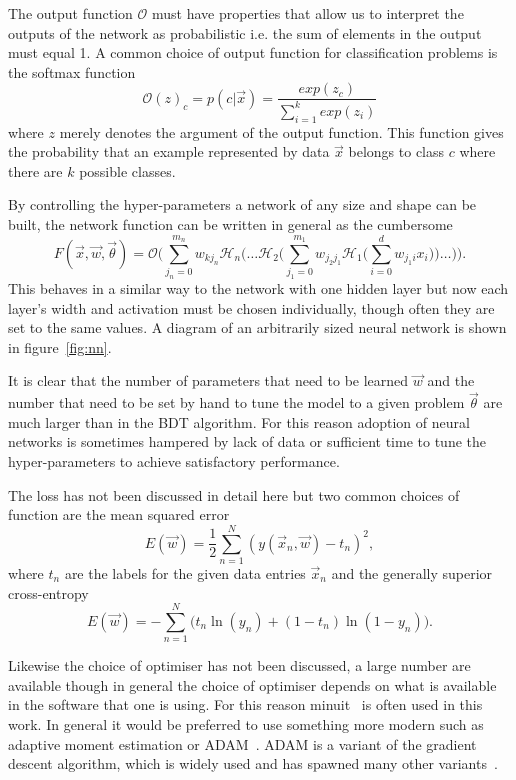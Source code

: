 The output function $\mathcal{O}$ must have properties that allow us to
interpret the outputs of the network as probabilistic i.e. the sum of elements
in the output must equal 1. A common choice of output function for
classification problems is the softmax function
\begin{equation}
  \mathcal{O}(z)_c = p(c|\vec{x}) = \frac{exp(z_c)}{\sum_{i=1}^kexp(z_i)}
  \label{eq:softmax}
\end{equation}
where $z$ merely denotes the argument of the output function. This function
gives the probability that an example represented by data $\vec{x}$ belongs to
class $c$ where there are $k$ possible classes.

By controlling the hyper-parameters a network of any size and shape can be
built, the network function can be written in general as the cumbersome
\begin{equation}
  F(\vec{x}, \vec{w}, \vec{\theta}) = \mathcal{O} \Bigg( \sum_{j_{n}=0}^{m_{n}} w_{kj_{n}}
  \mathcal{H}_{n} \Bigg( \dots \mathcal{H}_2  \Bigg( \sum_{j_{1}=0}^{m_{1}} w_{j_{2}j_{1}} 
  \mathcal{H}_{1} \Bigg( \sum_{i=0}^{d} w_{j_{1}i} x_{i} \Bigg) \Bigg) \dots \Bigg) \Bigg).
  \label{eq:fullnn}
\end{equation}
This behaves in a similar way to the network with one hidden layer but now each
layer's width and activation must be chosen individually, though often they are
set to the same values. A diagram of an arbitrarily sized neural network is
shown in figure~\ref{fig:nn}.

It is clear that the number of parameters that need to be learned $\vec{w}$ and
the number that need to be set by hand to tune the model to a given problem
$\vec{\theta}$ are much larger than in the BDT algorithm. For this reason
adoption of neural networks is sometimes hampered by lack of data or sufficient
time to tune the hyper-parameters to achieve satisfactory performance.

The loss has not been discussed in detail here but two common choices of
function are the mean squared error
\begin{equation}
E(\vec{w}) = \frac{1}{2}\sum_{n=1}^{N}(y(\vec{x}_n, \vec{w}) - t_n)^2,
\label{eq:MSE}
\end{equation}
where $t_n$ are the labels for the given data entries $\vec{x}_n$ and the
generally superior cross-entropy~\cite{XEntropySimard}
\begin{equation}
E(\vec{w}) = - \sum_{n=1}^{N} \Bigg (t_n \ln (y_n) + (1-t_n) \ln (1-y_n) \Bigg).
\label{eq:xentropy}
\end{equation}

Likewise the choice of optimiser has not been discussed, a large number are
available though in general the choice of optimiser depends on what is available
in the software that one is using. For this reason minuit~\cite{minuit} is often
used in this work. In general it would be preferred to use something more
modern such as adaptive moment estimation or ADAM~\cite{ADAMOpt}. ADAM is a
variant of the gradient descent algorithm, which is widely used and has spawned
many other variants~\cite{GDOverview}.



